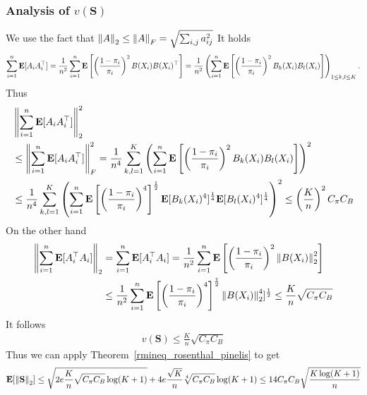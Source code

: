 \subsubsection*{Analysis of $v(\mathbf{S})$}
We use the fact that 
$
  \left\lVert A\right\rVert_2 
  \le
  \left\lVert A\right\rVert_F
  =
  \sqrt{
    \sum_{i,j}^{}
    a_{ij}^2
  }
$
It holds
\begin{gather*}
  \sum_{i=1}^{n}
  \mathbf{E}[A_iA_i^\top]
  =
  \frac{1}{n^2}
  \sum_{i=1}^{n}
  \mathbf{E}
  \left[ 
    \left( 
      \frac{1-\pi_i}{\pi_i}
    \right)^2
    B(X_i)B(X_i)^\top
  \right]
  =
  \frac{1}{n^2}
  \left( 
    \sum_{i=1}^{n}
    \mathbf{E}
    \left[ 
    \left( 
      \frac{1-\pi_i}{\pi_i}
    \right)^2
    B_k(X_i)B_l(X_i)
    \right]
  \right)
  _{1\le k,l \le K}
  .
\end{gather*}
Thus
\begin{align*}
  \begin{split}
  &\left\lVert
  \sum_{i=1}^{n}
  \mathbf{E}[A_iA_i^\top]
  \right\rVert_2^2
  \\
  &\le
  \left\lVert
  \sum_{i=1}^{n}
  \mathbf{E}[A_iA_i^\top]
  \right\rVert_F^2
  =
  \frac{1}{n^4}
  \sum_{k,l=1}^{K}
  \left( 
    \sum_{i=1}^{n}
    \mathbf{E}
    \left[ 
    \left( 
      \frac{1-\pi_i}{\pi_i}
    \right)^2
    B_k(X_i)B_l(X_i)
    \right]
  \right)^2
  \\
  &\le
  \frac{1}{n^4}
  \sum_{k,l=1}^{K}
  \left( 
    \sum_{i=1}^{n}
    \mathbf{E}
    \left[ 
    \left( 
      \frac{1-\pi_i}{\pi_i}
    \right)^4
    \right]
    ^\frac{1}{2}
    \mathbf{E}[
    B_k(X_i)^4
    ]^\frac{1}{4}
    \mathbf{E}[
    B_l(X_i)^4
    ]^\frac{1}{4}
  \right)^2
  \le
  \left(
  \frac{K}{n}
  \right)^2
  C_\pi C_B
  \end{split}
\end{align*}
On the other hand
\begin{align*}
  \begin{split}
  \left\lVert
  \sum_{i=1}^{n}
  \mathbf{E}[A^\top_iA_i]
  \right\rVert_2
  &=
  \sum_{i=1}^{n}
  \mathbf{E}[A^\top_iA_i]
  =
  \frac{1}{n^2}
    \sum_{i=1}^{n}
    \mathbf{E}
    \left[ 
    \left( 
      \frac{1-\pi_i}{\pi_i}
    \right)^2
    \left\lVert B(X_i)\right\rVert_2^2
    \right]
    \\
    &\le
  \frac{1}{n^2}
    \sum_{i=1}^{n}
    \mathbf{E}
    \left[ 
    \left( 
      \frac{1-\pi_i}{\pi_i}
    \right)^4
    \right]^\frac{1}{2}
    \left\lVert B(X_i)\right\rVert_2^4
    ]^\frac{1}{2}
    \le
    \frac{K}{n}\sqrt{
  C_\pi C_B
    }
  \end{split}
\end{align*}
It follows
\begin{gather*}
  v(\mathbf{S})
  \le
    \frac{K}{n}\sqrt{
  C_\pi C_B
  }
\end{gather*}
Thus we can apply Theorem~\ref{rmineq_rosenthal_pinelis}
to get
\begin{gather*}
  \mathbf{E}[\left\lVert\mathbf{S}\right\rVert_2]
  \le
  \sqrt{
    2e 
    \frac{K}{n}\sqrt{
  C_\pi C_B
  }
  \log
  (K+1)
  }
  +
  4e
  \frac{\sqrt{K}}{n}
  \sqrt[4]{
  C_\pi C_B
  }
  \log
  (K+1)
  \le
  14
  C_\pi C_B
  \sqrt{
    \frac{K \log(K+1)}{n}
  }
\end{gather*}
